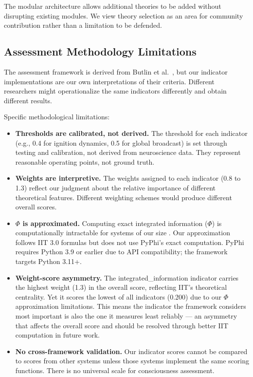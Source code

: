 The modular architecture allows additional theories to be added without disrupting existing modules. We view theory selection as an area for community contribution rather than a limitation to be defended.

\subsection{Assessment Methodology Limitations}

The assessment framework is derived from Butlin et al.\ \cite{butlin2023}, but our indicator implementations are our own interpretations of their criteria. Different researchers might operationalize the same indicators differently and obtain different results.

Specific methodological limitations:

\begin{itemize}
    \item \textbf{Thresholds are calibrated, not derived.} The threshold for each indicator (e.g., 0.4 for ignition dynamics, 0.5 for global broadcast) is set through testing and calibration, not derived from neuroscience data. They represent reasonable operating points, not ground truth.

    \item \textbf{Weights are interpretive.} The weights assigned to each indicator (0.8 to 1.3) reflect our judgment about the relative importance of different theoretical features. Different weighting schemes would produce different overall scores.

    \item \textbf{$\Phi$ is approximated.} Computing exact integrated information ($\Phi$) is computationally intractable for systems of our size \cite{tegmark2016}. Our approximation follows IIT 3.0 formulas but does not use PyPhi's exact computation. PyPhi requires Python 3.9 or earlier due to API compatibility; the framework targets Python 3.11+.

    \item \textbf{Weight-score asymmetry.} The integrated\_information indicator carries the highest weight (1.3) in the overall score, reflecting IIT's theoretical centrality. Yet it scores the lowest of all indicators (0.200) due to our $\Phi$ approximation limitations. This means the indicator the framework considers most important is also the one it measures least reliably --- an asymmetry that affects the overall score and should be resolved through better IIT computation in future work.

    \item \textbf{No cross-framework validation.} Our indicator scores cannot be compared to scores from other systems unless those systems implement the same scoring functions. There is no universal scale for consciousness assessment.
\end{itemize}

